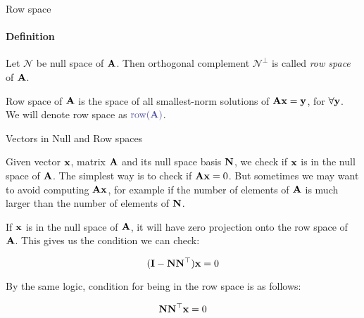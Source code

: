 \documentclass{beamer}
\begin{document}
\begin{frame}{Row space}
	\framesubtitle{Definition}
	\begin{flushleft}
		
		\begin{definition}
			Let $\mathcal{N}$ be null space of $\mathbf{A}$. Then orthogonal complement $\mathcal{N}^\perp$ is called \emph{row space} of $\mathbf{A}$.
		\end{definition}
	
		\bigskip
		
		Row space of $\mathbf{A}$ is the space of all smallest-norm solutions of $\mathbf{A}\mathbf{x} = \mathbf{y}$, for $\forall \mathbf{y}$. We will denote row space as $\textcolor{mydarkgray}{\text{row}(\bo{A})}$.
		
	\end{flushleft}
\end{frame}




\begin{frame}{Vectors in Null and Row spaces}
	\begin{flushleft}
		
		Given vector $\mathbf{x}$, matrix $\mathbf{A}$ and its null space basis $\mathbf{N}$, we check if $\mathbf{x}$ is in the null space of $\mathbf{A}$. The simplest way is to check if $\mathbf{A}\mathbf{x} = 0$. But sometimes we may want to avoid computing $\mathbf{A}\mathbf{x}$, for example if the number of elements of $\mathbf{A}$ is much larger than the number of elements of $\mathbf{N}$.
		
		\bigskip
		
		If $\mathbf{x}$ is in the null space of $\mathbf{A}$, it will have zero projection onto the row space of $\mathbf{A}$. This gives us the condition we can check:
		
		\begin{equation}
			(\mathbf{I} - \mathbf{N} \mathbf{N}^\top) \mathbf{x} = 0
		\end{equation}
		
		By the same logic, condition for being in the row space is as follows:
		
		\begin{equation}
			\mathbf{N} \mathbf{N}^\top \mathbf{x} = 0
		\end{equation}
		
		
	\end{flushleft}
\end{frame}
\end{document}
